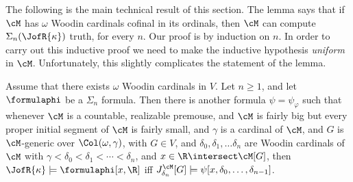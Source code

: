 The following is the main technical result of this section. The
lemma says that if $\cM$ has $\omega$ Woodin cardinals cofinal in its
ordinals, then $\cM$ can
compute $\Sigma_n(\JofR{\kappa})$ truth, for every $n$.
Our proof is by induction on $n$. In order to carry out this inductive
proof we need to make the inductive hypothesis \emph{uniform}
in $\cM$. Unfortunately, this slightly complicates the
statement of the lemma.

\begin{lemma}
\label{MoreCorrectness}
 Assume that there exists $\omega$ Woodin cardinals in $V$.
Let $n\geq 1$, and let $\formulaphi$ be a $\Sigma_n$ formula.
Then there is another formula $\psi=\psi_{\varphi}$ such that
whenever $\cM$ is a countable, realizable premouse, and $\cM$ is
fairly big but every proper initial segment of $\cM$ is fairly
small, and $\gamma$ is a cardinal of $\cM$, and
 $G$ is $\cM$-generic over $\Col(\omega,\gamma)$, with $G\in V$,
and $\delta_0, \delta_1, \dots \delta_n$ are Woodin cardinals of
$\cM$ with $\gamma<\delta_0<\delta_1<\cdots<\delta_n$, and
$x\in\R\intersect\cM[G]$,  then
$\JofR{\kappa}\models\formulaphi[x,\R]$ iff
$J^{\cM}_{\delta_n}[G]\models\psi[x,\delta_0,\dots,\delta_{n-1}]$.
\end{lemma}
